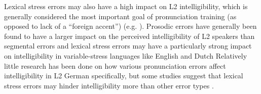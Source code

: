 \documentclass[a4paper]{article}
\begin{document}
%
	
	Lexical stress errors may also have a high impact on L2 intelligibility, which is generally considered the most important goal of pronunciation training (as opposed to lack of a ``foreign accent'') (e.g. \cite{Munro1999,Field2005}).
	Prosodic errors have generally been found to have a larger impact on the perceived intelligibility of L2 speakers than segmental errors 
	and 
	lexical stress errors may have a particularly strong impact on intelligibility in variable-stress languages like English and Dutch \cite{Cutler2005,Field2005} 
	Relatively little research has been done on how various pronunciation errors affect intelligibility in L2 German specifically, but some studies suggest that 
	lexical stress errors
	may hinder intelligibility more than other error types
	\cite{Hirschfeld1994,Hirschfeld2007}.
\end{document}

